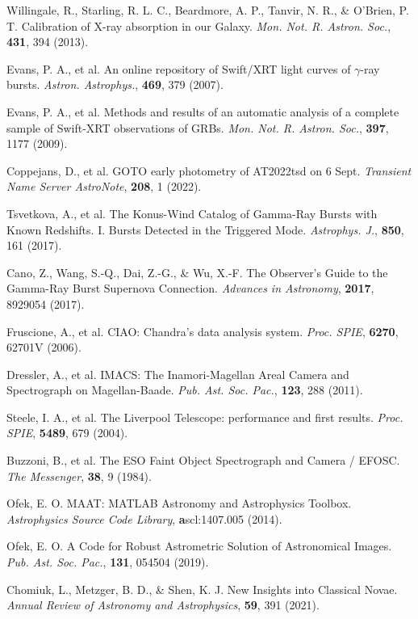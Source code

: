 \documentclass{nature_plusfigure}
\newcommand{\mn}{{Mon. Not. R. Astron. Soc.}}
\newcommand{\mnras}{\mn}
\newcommand{\apj}{{Astrophys. J.}}
\newcommand{\aap}{{Astron. Astrophys.}}
\newcommand{\pasp}{{Pub. Ast. Soc. Pac.}}
\newcommand{\procspie}{Proc. SPIE}
\newcommand{\araa}{Annual Review of Astronomy and Astrophysics}
\begin{document}
\begin{methods}
\begin{thebibliography}{10}
 Willingale, R., Starling, R. L. C., Beardmore, A. P., Tanvir, N. R., \& O'Brien, P. T. Calibration of X-ray absorption in our Galaxy. \emph{\mnras}, \textbf{431}, 394 (2013). 

 Evans, P. A., et al. An online repository of Swift/XRT light curves of $\gamma$-ray bursts. \emph{\aap}, \textbf{469}, 379 (2007). 

 Evans, P. A., et al. Methods and results of an automatic analysis of a complete sample of Swift-XRT observations of GRBs. \emph{\mnras}, \textbf{397}, 1177 (2009). 

 Coppejans, D., et al. GOTO early photometry of AT2022tsd on 6 Sept. \emph{Transient Name Server AstroNote}, \textbf{208}, 1 (2022). 

 Tsvetkova, A., et al. The Konus-Wind Catalog of Gamma-Ray Bursts with Known Redshifts. I. Bursts Detected in the Triggered Mode. \emph{\apj}, \textbf{850}, 161 (2017). 

 Cano, Z., Wang, S.-Q., Dai, Z.-G., \& Wu, X.-F. The Observer's Guide to the Gamma-Ray Burst Supernova Connection. \emph{Advances in Astronomy}, \textbf{2017}, 8929054 (2017). 

 Fruscione, A., et al. CIAO: Chandra's data analysis system. \emph{\procspie}, \textbf{6270}, 62701V (2006). 

 Dressler, A., et al. IMACS: The Inamori-Magellan Areal Camera and Spectrograph on Magellan-Baade. \emph{\pasp}, \textbf{123}, 288 (2011). 

 Steele, I. A., et al. The Liverpool Telescope: performance and first results. \emph{\procspie}, \textbf{5489}, 679 (2004). 

 Buzzoni, B., et al. The ESO Faint Object Spectrograph and Camera / EFOSC. \emph{The Messenger}, \textbf{38}, 9 (1984). 

 Ofek, E. O. MAAT: MATLAB Astronomy and Astrophysics Toolbox. \emph{Astrophysics Source Code Library}, \textbf ascl:1407.005 (2014). 

 Ofek, E. O. A Code for Robust Astrometric Solution of Astronomical Images. \emph{\pasp}, \textbf{131}, 054504 (2019). 

 Chomiuk, L., Metzger, B. D., \& Shen, K. J. New Insights into Classical Novae. \emph{\araa}, \textbf{59}, 391 (2021). 


\end{thebibliography}
\end{methods}
\end{document}
